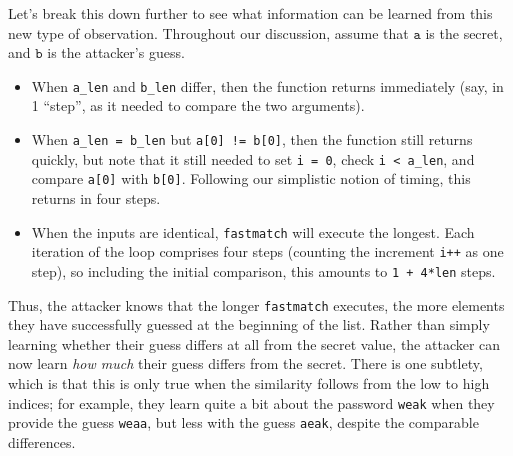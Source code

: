 \documentclass[11pt,twoside]{scrartcl}
\begin{document}
Let's break this down further to see what information can be learned from this new type of observation.
Throughout our discussion, assume that $\mathtt{a}$ is the secret, and $\mathtt{b}$ is the attacker's guess.
\begin{itemize}
\item When \verb'a_len' and \verb'b_len' differ, then the function returns immediately (say, in 1 ``step'', as it needed to compare the two arguments).
\item When \verb'a_len = b_len' but \verb'a[0] != b[0]', then the function still returns quickly, but note that it still needed to set \verb'i = 0', check \verb'i < a_len', and compare \verb'a[0]' with \verb'b[0]'. Following our simplistic notion of timing, this returns in four steps.
\item When the inputs are identical, \texttt{fastmatch} will execute the longest. Each iteration of the loop comprises four steps (counting the increment \verb'i++' as one step), so including the initial comparison, this amounts to \verb'1 + 4*len' steps.
\end{itemize}

Thus, the attacker knows that the longer \texttt{fastmatch} executes, the more elements they have successfully guessed at the beginning of the list.
Rather than simply learning whether their guess differs at all from the secret value, the attacker can now learn \emph{how much} their guess differs from the secret.
There is one subtlety, which is that this is only true when the similarity follows from the low to high indices; for example, they learn quite a bit about the password \verb'weak' when they provide the guess \verb'weaa', but less with the guess \verb'aeak', despite the comparable differences.
\end{document}
